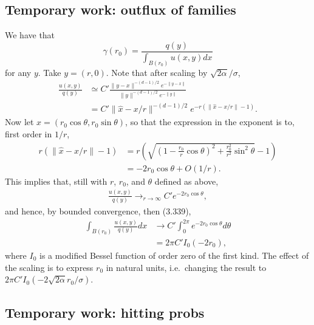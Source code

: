 \documentclass{article}
\begin{document}
\subsection{Temporary work: outflux of families}
\label{apx:lesbegue}

We have that
\[
    \gamma(r_0) = \frac{q(y)}{\int_{B(r_0)} u(x,y) dx}
\]
for any $y$.  
Take $y=(r,0)$.
Note that after scaling by $\sqrt{2\alpha}/\sigma$,
\begin{align}
    \frac{ u(x,y) }{ q(y) } &\simeq C' \frac{ \|y-x\|^{-(d-1)/2} e^{-\|y-x\|} }{ \|y\|^{-(d-1)/2} e^{-\|y\|} } \\
        &= C' \| \hat x - x/r \|^{-(d-1)/2} e^{-r (\|\hat x - x/r\| - 1)} .
\end{align}
Now let $x = (r_0 \cos \theta, r_0 \sin \theta)$,
so that the expression in the exponent is to, first order in $1/r$,
\begin{align}
    r (\|\hat x - x/r\| - 1) &= r \left( \sqrt{ \left( 1 - \frac{r_0}{r} \cos \theta \right)^2 + \frac{r_0^2}{r^2} \sin^2 \theta } - 1 \right ) \\
            &= - 2 r_0 \cos \theta + O(1/r) .
\end{align}
This implies that, still with $r$, $r_0$, and $\theta$ defined as above,
\begin{align}
    \frac{u(x,y)}{q(y)} \longrightarrow_{r \to \infty} C' e^{-2 r_0 \cos \theta} ,
\end{align}
and hence, by bounded convergence, then \citet{gradshteyn2007table} (3.339),
\begin{align}
    \int_{B(r_0)} \frac{u(x,y)}{q(y)} dx &\to C' \int_0^{2 \pi} e^{-2 r_0 \cos \theta} d\theta \\
                                         &= 2 \pi C' I_0(-2r_0),
\end{align}
where $I_0$ is a modified Bessel function of order zero of the first kind.
The effect of the scaling is to express $r_0$ in natural units, i.e.\ changing the result to $2 \pi C' I_0( - 2 \sqrt{2\alpha} r_0 / \sigma ) $.



\subsection{Temporary work: hitting probs}
\end{document}
